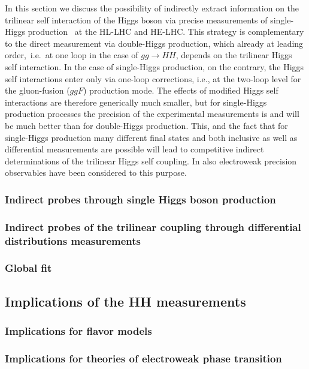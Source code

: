 \documentclass[../report.tex]{subfiles}
\providecommand{\main}{..}
\begin{document}
In this section we discuss the possibility of indirectly extract information on the trilinear self interaction of the Higgs boson via precise measurements of single-Higgs production~\cite{McCullough:2013rea,Gorbahn:2016uoy,Degrassi:2016wml,Bizon:2016wgr,DiVita:2017eyz,Barklow:2017awn,Maltoni:2017ims,DiVita:2017vrr,Maltoni:2018ttu} at the HL-LHC and HE-LHC. This strategy is complementary to the direct measurement via double-Higgs production, which already at leading order,~i.e.~at one loop in the case of $gg \to HH$, depends on the trilinear Higgs self interaction. In the case of single-Higgs production, on the contrary, the Higgs self interactions enter only via one-loop corrections, i.e., at the two-loop level for the gluon-fusion ($ggF$) production mode. The effects of modified Higgs self interactions are therefore generically much smaller, but for single-Higgs production processes the precision of the experimental measurements is and will be much better than for double-Higgs production. This, and the fact that for single-Higgs production many different final states and both inclusive as well as  differential measurements are possible will lead to competitive indirect determinations of the trilinear Higgs self coupling. In \cite{Degrassi:2017ucl,Kribs:2017znd} also electroweak precision observables have been considered to this purpose.

\subsubsection{Indirect probes through single Higgs boson production}



\subsubsection{Indirect probes of the trilinear coupling through differential distributions measurements}




\subsubsection{Global fit}
\label{sec:HH_Global_fit}


\subsection{Implications of the HH measurements}
\label{sec:HH_implications}

\subsubsection{Implications for flavor models}



\subsubsection{Implications for theories of electroweak phase transition}

\end{document}
